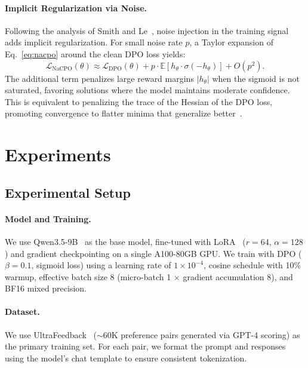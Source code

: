\documentclass{article}
\newcommand{\E}{\mathbb{E}}
\begin{document}
\paragraph{Implicit Regularization via Noise.}
Following the analysis of Smith and Le~\cite{PLACEHOLDER_smith2018dont}, noise injection in the training signal adds implicit regularization.
For small noise rate $p$, a Taylor expansion of Eq.~\ref{eq:nacpo} around the clean DPO loss yields:
\begin{equation}
    \mathcal{L}_{\text{NaCPO}}(\theta) \approx \mathcal{L}_{\text{DPO}}(\theta) + p \cdot \E\left[ h_\theta \cdot \sigma(-h_\theta) \right] + O(p^2).
    \label{eq:regularization}
\end{equation}
The additional term penalizes large reward margins $|h_\theta|$ when the sigmoid is not saturated, favoring solutions where the model maintains moderate confidence.
This is equivalent to penalizing the trace of the Hessian of the DPO loss, promoting convergence to flatter minima that generalize better~\cite{PLACEHOLDER_foret2021sharpness}.


\section{Experiments}
\label{sec:experiments}

\subsection{Experimental Setup}

\paragraph{Model and Training.}
We use Qwen3.5-9B~\cite{PLACEHOLDER_qwen3_5} as the base model, fine-tuned with LoRA~\cite{PLACEHOLDER_hu2022lora} ($r{=}64$, $\alpha{=}128$) and gradient checkpointing on a single A100-80GB GPU.
We train with DPO ($\beta{=}0.1$, sigmoid loss) using a learning rate of $1\times10^{-4}$, cosine schedule with 10\% warmup, effective batch size 8 (micro-batch 1 $\times$ gradient accumulation 8), and BF16 mixed precision.

\paragraph{Dataset.}
We use UltraFeedback~\cite{PLACEHOLDER_cui2024ultrafeedback} ($\sim$60K preference pairs generated via GPT-4 scoring) as the primary training set.
For each pair, we format the prompt and responses using the model's chat template to ensure consistent tokenization.
\end{document}
